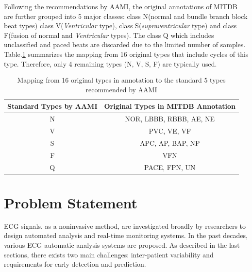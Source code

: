 Following the recommendations by AAMI, the original annotations of MITDB are further grouped into 5 major classes: class N(normal and bundle branch block beat types) class V(\textit{Ventricular} type), class S(\textit{supraventricular} type) and class F(fusion of normal and \textit{Ventricular} types). The class Q which includes unclassified and paced beats are discarded due to the limited number of samples. Table.\ref{table:grouping_types} summarizes the mapping from 16 original types that include cycles of this type. Therefore, only 4 remaining types (N, V, S, F) are typically used.%

\begin{table}[h]
\centering
\caption{Mapping from 16 original types in annotation to the standard 5 types recommended by AAMI}
\label{table:grouping_types}
\begin{tabular}{|c|c|}
\hline
Standard Types by AAMI & Original Types in MITDB Annotation \\ \hline
N                      & NOR, LBBB, RBBB, AE, NE            \\ \hline
V                      & PVC, VE, VF                        \\ \hline
S                      & APC, AP, BAP, NP                   \\ \hline
F                      & VFN                                \\ \hline
Q                      & PACE, FPN, UN                      \\ \hline
\end{tabular}
\end{table}




\section{Problem Statement}

ECG signals, as a noninvasive method, are investigated broadly by researchers to design automated analysis and real-time monitoring systems. In the past decades, various ECG automatic analysis systems are proposed. As described in the last sections, there exists two main challenges: inter-patient variability and requirements for early detection and prediction. %

